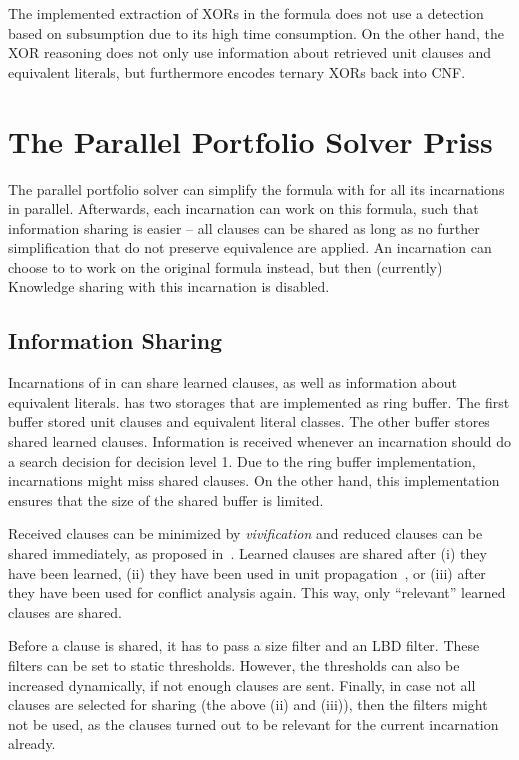 \documentclass[conference]{IEEEtran}
\begin{document}
The implemented extraction of XORs in the formula does not use a detection based on subsumption due to its high time consumption. 
On the other hand, the XOR reasoning does not only use information about retrieved unit clauses and equivalent literals, but furthermore encodes ternary XORs back into CNF. 

\section{The Parallel Portfolio Solver Priss}

The parallel portfolio solver \priss can simplify the formula with \coprocessor for all its incarnations in parallel. 
Afterwards, each incarnation can work on this formula, such that information sharing is easier -- all clauses can be shared as long as no further simplification that do not preserve equivalence are applied. 
An incarnation can choose to to work on the original formula instead, but then (currently) Knowledge sharing with this incarnation is disabled. 

\subsection{Information Sharing}

Incarnations of \riss in \priss can share learned clauses, as well as information about equivalent literals. 
\priss has two storages that are implemented as ring buffer. 
The first buffer stored unit clauses and equivalent literal classes. 
The other buffer stores shared learned clauses. 
Information is received whenever an incarnation should do a search decision for decision level 1. 
Due to the ring buffer implementation, incarnations might miss shared clauses. 
On the other hand, this implementation ensures that the size of the shared buffer is limited. 

Received clauses can be minimized by \emph{vivification} and reduced clauses can be shared immediately, as proposed in~\cite{siert}. 
Learned clauses are shared after (i) they have been learned, (ii) they have been used in unit propagation~\cite{glucose4-sat2014}, or (iii) after they have been used for conflict analysis again. 
This way, only ``relevant'' learned clauses are shared. 

Before a clause is shared, it has to pass a size filter and an LBD filter. 
These filters can be set to static thresholds. 
However, the thresholds can also be increased dynamically, if not enough clauses are sent. 
Finally, in case not all clauses are selected for sharing (the above (ii) and (iii)), then the filters might not be used, as the clauses turned out to be relevant for the current incarnation already. 
\end{document}
